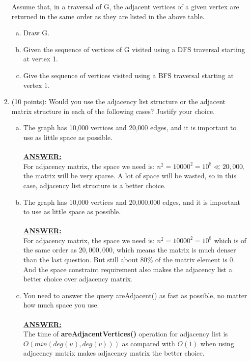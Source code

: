 \documentclass{article}
\newcommand{\answer}{\textbf{\\\underline{ANSWER:}\\}}
\begin{document}
\begin{enumerate}
Assume that, in a traversal of G, the adjacent vertices of a given
vertex are returned in the same order as they are listed in the above
table.

\begin{enumerate}[a.]
\item Draw G. \\

\item Given the sequence of vertices of G visited using a DFS traversal
starting at vertex 1. 

\item Give the sequence of vertices visited using a BFS traversal starting
at vertex 1. 
\end{enumerate}

\item (10 points): Would you use the adjacency list structure or the
  adjacent matrix structure in each of the following cases? Justify
  your choice. 
\begin{enumerate}[a.]
\item The graph has 10,000 vertices and 20,000 edges, and it is important
to use as little space as possible.\\
\answer For adjacency matrix, the space we need is: $n^2=10000^2=10^8\ll
20,000$, the matrix will be very sparse. A lot of space will be
wasted, so in this case, adjacency list structure is a better choice. 
 
\item The graph has 10,000 vertices and 20,000,000 edges, and it is
important to use as little space as possible. \\
\answer For adjacency matrix, the space we need is: $n^2=10000^2=10^8$
which is of the same order as $20,000,000$, which means the matrix is
much denser than the last question. But still about $80\%$ of the
matrix element is 0. And the space constraint requirement also makes
the adjacency list a better choice over adjacency matrix. 

\item You need to answer the query areAdjacent() as fast as possible, no
matter how much space you use. \\
\answer The time of \textbf{areAdjacentVertices()} operation for
adjacency list is $O(min(deg(u),deg(v)))$ as compared with $O(1)$ when
using adjacency matrix makes adjacency matrix the better choice. 

\end{enumerate}


\end{enumerate}
\end{document}
